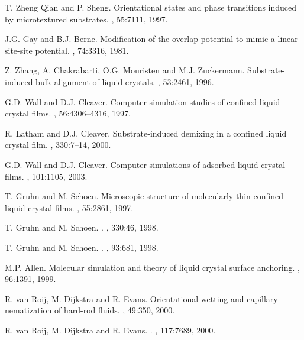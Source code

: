 \documentclass[aps,10pt,twocolumn]{revtex4}
\begin{document}
\begin{thebibliography}{10}
{T. Zheng Qian and P. Sheng}.
\newblock Orientational states and phase transitions induced by microtextured
  substrates.
, 55:7111, 1997.

{J.G. Gay and B.J. Berne}.
\newblock Modification of the overlap potential to mimic a linear site-site
  potential.
, 74:3316, 1981.

{Z. Zhang, A. Chakrabarti, O.G. Mouristen and M.J. Zuckermann}.
\newblock Substrate-induced bulk alignment of liquid crystals.
, 53:2461, 1996.

{G.D. Wall and D.J. Cleaver}.
\newblock Computer simulation studies of confined liquid-crystal films.
, 56:4306--4316, 1997.

{R. Latham and D.J. Cleaver}.
\newblock Substrate-induced demixing in a confined liquid crystal film.
, 330:7--14, 2000.

{G.D. Wall and D.J. Cleaver}.
\newblock Computer simulations of adsorbed liquid crystal films.
, 101:1105, 2003.

{T. Gruhn and M. Schoen}.
\newblock Microscopic structure of molecularly thin confined liquid-crystal
  films.
, 55:2861, 1997.

{T. Gruhn and M. Schoen}.
.
, 330:46, 1998.

{T. Gruhn and M. Schoen}.
.
, 93:681, 1998.

{M.P. Allen}.
\newblock Molecular simulation and theory of liquid crystal surface anchoring.
, 96:1391, 1999.

{R. van Roij, M. Dijkstra and R. Evans}.
\newblock Orientational wetting and capillary nematization of hard-rod fluids.
, 49:350, 2000.

{R. van Roij, M. Dijkstra and R. Evans}.
.
, 117:7689, 2000.


\end{thebibliography}
\end{document}
